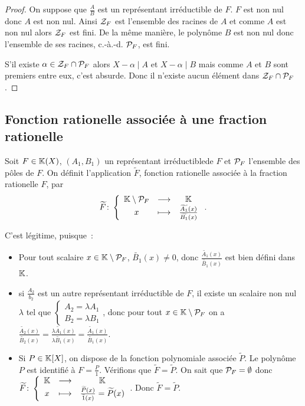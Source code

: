 \begin{proof}
  On suppose que \(\frac{A}{B}\) est un représentant irréductible de \(F\). \(F\) est non nul donc \(A\) est non nul. Ainsi \(\ZZ_F\) est l'ensemble des racines de \(A\) et comme \(A\) est non nul alors \(\ZZ_F\) est fini. De la même manière, le polynôme \(B\) est non nul donc l'ensemble de ses racines, c.-à.-d. \(\P_F\), est fini.
  
  S'il existe \(\alpha \in \ZZ_F \cap \P_F\) alors \(X-\alpha\mid{}A\) et \(X-\alpha\mid{}B\) mais comme \(A\) et \(B\) sont premiers entre eux, c'est absurde. Donc il n'existe aucun élément dans \(\ZZ_F \cap \P_F\).
\end{proof}

\subsection{Fonction rationelle associée à une fraction rationelle}

\begin{defdef}
  Soit \(F \in \K(X)\), \((A_1,B_1)\) un représentant irréductiblede \(F\) et \(\P_F\) l'ensemble des pôles de \(F\). On définit l'application \(\widetilde{F}\), fonction rationelle associée à la fraction rationelle \(F\), par
  \begin{equation}
    \fonction{\widetilde{F}}{\K\setminus\P_F}{\K}{x}{\frac{\widetilde{A_1}(x)}{\widetilde{B_1}(x)}}.
  \end{equation}
\end{defdef}

C'est légitime, puisque~:
\begin{itemize}
\item Pour tout scalaire \(x \in \K\setminus\P_F\), \(\widetilde{B_1}(x) \neq 0\), donc \(\frac{\widetilde{A_1}(x)}{\widetilde{B_1}(x)}\) est bien défini dans \(\K\).
\item si \(\frac{A_2}{b_2}\) est un autre représentant irréductible de \(F\), il existe un scalaire non nul \(\lambda\) tel que \(\begin{cases}A_2 = \lambda A_1 \\ B_2=\lambda B_1\end{cases}\), donc pour tout \(x \in \K\setminus\P_F\) on a \(\frac{\widetilde{A_2}(x)}{\widetilde{B_2}(x)}=\frac{\lambda \widetilde{A_1}(x)}{\lambda \widetilde{B_1}(x)}=\frac{\widetilde{A_1}(x)}{\widetilde{B_1}(x)}\).
\item Si \(P \in \K[X]\), on dispose de la fonction polynomiale associée \(\widetilde{P}\). Le polynôme \(P\) est identifié à \(F=\frac{P}{1}\). Vérifions que \(\widetilde{F}=\widetilde{P}\). On sait que \(\P_F=\emptyset\) donc \(\fonction{\widetilde{F}}{\K}{\K}{x}{\frac{\widetilde{P}(x)}{\widetilde{1}(x)}=\widetilde{P}(x)}\). Donc  \(\widetilde{F}=\widetilde{P}\). 
\end{itemize}

